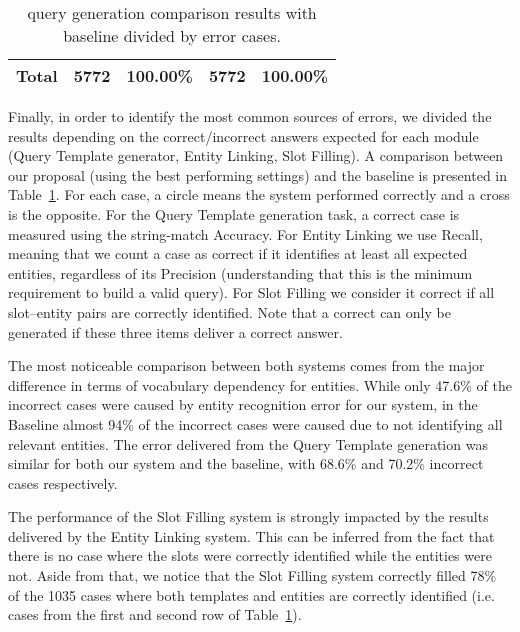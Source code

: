 \begin{table}[h!]
\begin{tabular}{|ccc|cc|cc|}
    \multicolumn{3}{|c|}{\textbf{Total}}                                                                                                                 & 5772                                                                                     & 100.00\%                                                       & 5772                                                                                     & 100.00\%                                                       \\ \hline
    \end{tabular}
    \caption{\SPARQL{} query generation comparison results with baseline divided by error cases.}
    \label{table:queryGenerationErrorRatio}
\end{table}

Finally, in order to identify the most common sources of errors, we divided the results depending 
on the correct/incorrect answers expected for each module (Query Template generator, Entity Linking, 
Slot Filling). A comparison between our proposal (using the best performing settings) and the 
baseline is presented in Table~\ref{table:queryGenerationErrorRatio}. For each case, a circle 
means the system performed correctly and a cross is the opposite. For the Query Template 
generation task, a correct case is measured using the string-match Accuracy. For Entity Linking 
we use Recall, meaning that we count a case as correct if it identifies at least all expected 
entities, regardless of its Precision (understanding that this is the minimum requirement to 
build a valid \SPARQL{} query). For Slot Filling we consider it correct if all slot--entity pairs 
are correctly identified. Note that a correct \SPARQL{} can only be generated if these three items 
deliver a correct answer.

The most noticeable comparison between both systems comes from the major difference in 
terms of vocabulary dependency for entities. While only 47.6\% of the incorrect cases were caused by entity 
recognition error for our system, in the Baseline almost 94\% of the incorrect cases were caused 
due to not identifying all relevant entities. The error delivered from the Query Template 
generation was similar for both our system and the baseline, with 68.6\% and 70.2\% incorrect 
cases respectively.

The performance of the Slot Filling system is strongly impacted by the results delivered by the 
Entity Linking system. This can be inferred from the fact that there is no case where the slots 
were correctly identified while the entities were not. Aside from that, we notice that the Slot 
Filling system correctly filled 78\% of the 1035 cases where both templates and entities 
are correctly identified (i.e. cases from the first and second row of 
Table~\ref{table:queryGenerationErrorRatio}). 

